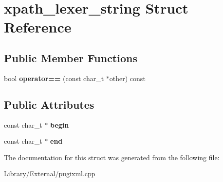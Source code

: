 \hypertarget{structxpath__lexer__string}{}\section{xpath\+\_\+lexer\+\_\+string Struct Reference}
\label{structxpath__lexer__string}
\subsection*{Public Member Functions}
\begin{DoxyCompactItemize}
\item 
\hypertarget{structxpath__lexer__string_ac19adfd75832be8eff3f430aa3cb3c14}{}bool {\bfseries operator==} (const char\+\_\+t $\ast$other) const \label{structxpath__lexer__string_ac19adfd75832be8eff3f430aa3cb3c14}

\end{DoxyCompactItemize}
\subsection*{Public Attributes}
\begin{DoxyCompactItemize}
\item 
\hypertarget{structxpath__lexer__string_a0b985863d7363a75d4fdd0a7ece1fca0}{}const char\+\_\+t $\ast$ {\bfseries begin}\label{structxpath__lexer__string_a0b985863d7363a75d4fdd0a7ece1fca0}

\item 
\hypertarget{structxpath__lexer__string_a13bbedeca2f8c2fb1e294325eea66878}{}const char\+\_\+t $\ast$ {\bfseries end}\label{structxpath__lexer__string_a13bbedeca2f8c2fb1e294325eea66878}

\end{DoxyCompactItemize}


The documentation for this struct was generated from the following file\+:\begin{DoxyCompactItemize}
\item 
Library/\+External/pugixml.\+cpp\end{DoxyCompactItemize}
